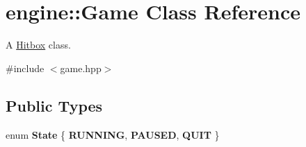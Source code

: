 \hypertarget{classengine_1_1_game}{}\section{engine\+:\+:Game Class Reference}
\label{classengine_1_1_game}


A \hyperlink{classengine_1_1_hitbox}{Hitbox} class.  




{\ttfamily \#include $<$game.\+hpp$>$}

\subsection*{Public Types}
\begin{DoxyCompactItemize}
\item 
enum {\bfseries State} \{ {\bfseries R\+U\+N\+N\+I\+NG}, 
{\bfseries P\+A\+U\+S\+ED}, 
{\bfseries Q\+U\+IT}
 \}\hypertarget{classengine_1_1_game_a4929fccb048ef64bc376c3950c4098e7}{}\label{classengine_1_1_game_a4929fccb048ef64bc376c3950c4098e7}

\end{DoxyCompactItemize}

